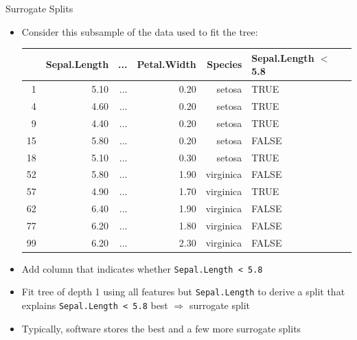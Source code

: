 \documentclass[11pt,compress,t,notes=noshow, xcolor=table]{beamer}
\begin{document}
\begin{vbframe}{Surrogate Splits}
\begin{itemize}
\item Consider this subsample of the data used to fit the tree:
\begin{table}[ht]
\tiny
\centering
\begin{tabular}{rrrrrll}
  \hline
 & Sepal.Length & ... & Petal.Width & Species & Sepal.Length $<$ 5.8 \\
  \hline
1 & 5.10 & ... & 0.20 & setosa & TRUE \\
  4 & 4.60 & ... & 0.20 & setosa & TRUE \\
  9 & 4.40 & ... & 0.20 & setosa & TRUE \\
  15 & 5.80 & ... & 0.20 & setosa & FALSE \\
  18 & 5.10 & ... & 0.30 & setosa & TRUE \\
  52 & 5.80 & ... & 1.90 & virginica & FALSE \\
  57 & 4.90 & ... & 1.70 & virginica & TRUE \\
  62 & 6.40 & ... & 1.90 & virginica & FALSE \\
  77 & 6.20 & ... & 1.80 & virginica & FALSE \\
  99 & 6.20 & ... & 2.30 & virginica & FALSE \\
   \hline
\end{tabular}
\end{table}
\item Add column that indicates whether \texttt{Sepal.Length < 5.8}
\item Fit tree of depth 1 using all features but \texttt{Sepal.Length} %
to derive a split that explains
\texttt{Sepal.Length < 5.8} best $\Rightarrow$ surrogate split
\item Typically, software stores the best and a few more surrogate splits

\end{itemize}


\end{vbframe}


\endlecture
\end{document}

